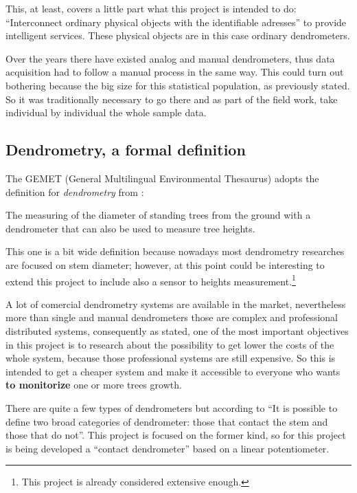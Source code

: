 \documentclass[11pt,a4paper,dvipsnames,twoside]{article}
\newcommand{\lang}[1] {\textbf{\color{Tomato1}#1}}
\begin{document}
This, at least, covers a little part what this project is intended to do: \enquote{Interconnect ordinary physical objects with the identifiable adresses} to provide intelligent services. These physical objects are in this case ordinary dendrometers.

Over the years there have existed analog and manual dendrometers, thus data acquisition had to follow a manual process in the same way. This could turn out bothering because the big size for this statistical population, as previously stated. So it was traditionally necessary to go there and as part of the field work, take individual by individual the whole sample data.


\subsection{Dendrometry, a formal definition}
The GEMET (General Multilingual Environmental Thesaurus) adopts the definition for \textit{dendrometry} from \cite{DictNaturalRes}:

\begin{quoting}
  The measuring of the diameter of standing trees from the ground with a dendrometer that can also be used to measure tree heights.
\end{quoting}

This one is a bit wide definition because nowadays most dendrometry researches are focused on stem diameter; however, at this point could be interesting to extend this project to include also a sensor to heights measurement.\footnote{This project is already considered extensive enough.} 

A lot of comercial dendrometry systems are available in the market, nevertheless more than single and manual dendrometers those are complex and professional distributed systems, consequently as stated, one of the most important objectives in this project is to research about the possibility to get lower the costs of the whole system, because those professional systems are still expensive. So this is intended to get a cheaper system and make it accessible to everyone who wants \lang{to monitorize} one or more trees growth. 

There are quite a few types of dendrometers but according to \cite{DendroResearch} \enquote{It is possible to define two broad categories of dendrometer: those that contact the stem and those that do not}. This project is focused on the former kind, so for this project is being developed a \enquote{contact dendrometer} based on a linear potentiometer.
\end{document}
